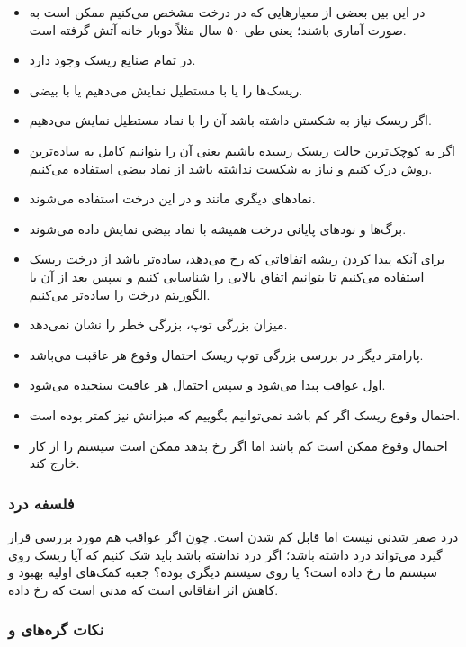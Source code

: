 \begin{itemize}
    \item در این بین بعضی از معیار‌هایی که در درخت مشخص می‌کنیم ممکن است به صورت
    آماری باشند؛ یعنی طی ۵۰ سال مثلاً دوبار خانه آتش گرفته است.
    \item در تمام صنایع ریسک وجود دارد.
    \item ریسک‌ها را یا با مستطیل نمایش می‌دهیم یا با بیضی.
    \item اگر ریسک نیاز به شکستن داشته باشد آن را با نماد مستطیل نمایش می‌دهیم.
    \item اگر به کوچک‌ترین حالت ریسک رسیده باشیم یعنی آن را بتوانیم کامل به
    ساده‌ترین روش درک کنیم و نیاز به شکست نداشته باشد از نماد بیضی استفاده
    می‌کنیم.
    \item نماد‌های دیگری مانند  و  در این درخت استفاده می‌شوند.
    \item برگ‌ها و نود‌های پایانی درخت همیشه با نماد بیضی نمایش داده می‌شوند.
    \item برای آنکه پیدا کردن ریشه اتفاقاتی که رخ می‌دهد، ساده‌تر باشد از درخت
    ریسک استفاده می‌کنیم تا بتوانیم اتفاق بالایی را شناسایی کنیم و سپس بعد از آن
    با الگوریتم  درخت را ساده‌تر می‌کنیم.
    \item میزان بزرگی توپ، بزرگی خطر را نشان نمی‌دهد.
    \item پارامتر دیگر در بررسی بزرگی توپ ریسک احتمال وقوع هر عاقبت می‌باشد.
    \item اول عواقب پیدا می‌شود و سپس احتمال هر عاقبت سنجیده می‌شود.
    \item احتمال وقوع ریسک اگر کم باشد نمی‌توانیم بگوییم که میزانش نیز کمتر بوده
    است.
    \item احتمال وقوع ممکن است کم باشد اما اگر رخ بدهد ممکن است سیستم را از کار
    خارج کند.
\end{itemize}

\subsubsection{فلسفه درد}

درد صفر شدنی نیست اما قابل کم شدن است. چون اگر عواقب هم مورد بررسی قرار گیرد
می‌تواند درد داشته باشد؛ اگر درد نداشته باشد باید شک کنیم که آیا ریسک روی سیستم
ما رخ داده است؟ یا روی سیستم دیگری بوده؟ جعبه کمک‌های اولیه بهبود و کاهش اثر
اتفاقاتی است که مدتی است که رخ داده.

\subsubsection{نکات گره‌های  و }

